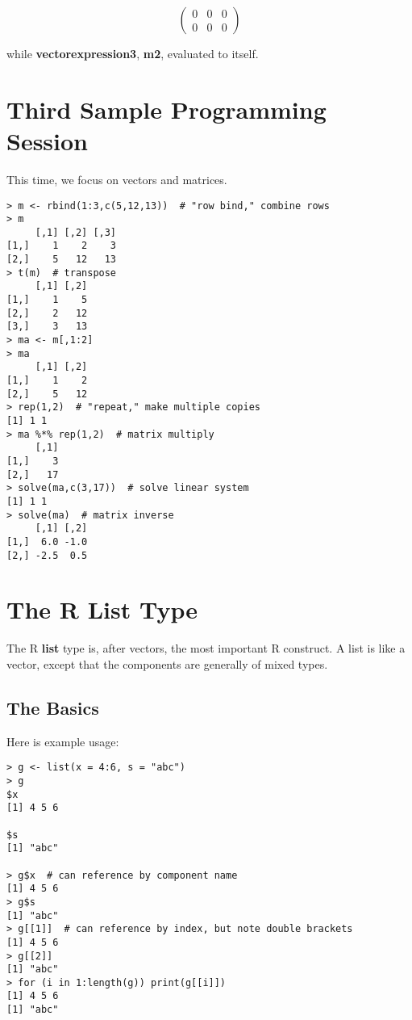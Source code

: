 \begin{equation}
\left (
\begin{array}{rrr}
0 & 0 & 0 \\
0 & 0 & 0
\end{array}
\right )
\end{equation}

while {\bf vectorexpression3}, {\bf m2}, evaluated to itself.

\section{Third Sample Programming Session}

This time, we focus on vectors and matrices.

\begin{lstlisting}
> m <- rbind(1:3,c(5,12,13))  # "row bind," combine rows
> m
     [,1] [,2] [,3]
[1,]    1    2    3
[2,]    5   12   13
> t(m)  # transpose
     [,1] [,2]
[1,]    1    5
[2,]    2   12
[3,]    3   13
> ma <- m[,1:2]
> ma
     [,1] [,2]
[1,]    1    2
[2,]    5   12
> rep(1,2)  # "repeat," make multiple copies
[1] 1 1
> ma %*% rep(1,2)  # matrix multiply
     [,1]
[1,]    3
[2,]   17
> solve(ma,c(3,17))  # solve linear system
[1] 1 1
> solve(ma)  # matrix inverse
     [,1] [,2]
[1,]  6.0 -1.0
[2,] -2.5  0.5
\end{lstlisting}

\section{The R List Type}

The R {\bf list} type is, after vectors, the most important R construct.
A list is like a vector, except that the components are generally of
mixed types.

\subsection{The Basics}

Here is example usage:

\begin{lstlisting}
> g <- list(x = 4:6, s = "abc")
> g
$x
[1] 4 5 6

$s
[1] "abc"

> g$x  # can reference by component name
[1] 4 5 6
> g$s
[1] "abc"
> g[[1]]  # can reference by index, but note double brackets
[1] 4 5 6
> g[[2]]
[1] "abc"
> for (i in 1:length(g)) print(g[[i]])
[1] 4 5 6
[1] "abc"
\end{lstlisting}

